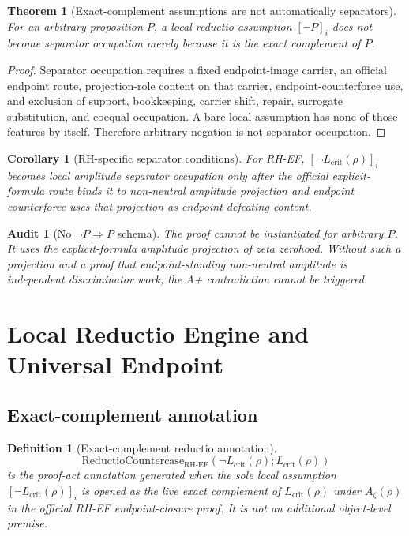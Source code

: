 \documentclass[11pt]{article}
\newtheorem{definition}{Definition}[section]
\newtheorem{theorem}{Theorem}[section]
\newtheorem{corollary}{Corollary}[section]
\newtheorem{audit}{Audit}[section]
\newcommand{\Az}{A_{\zeta}}
\newcommand{\Lcrit}{L_{\mathrm{crit}}}
\newcommand{\RH}{\mathrm{RH}}
\newcommand{\EF}{\mathrm{EF}}
\begin{document}
\begin{theorem}[Exact-complement assumptions are not automatically separators]
For an arbitrary proposition \(P\), a local reductio assumption \([\neg P]_i\) does not become separator occupation merely because it is the exact complement of \(P\).
\end{theorem}

\begin{proof}
Separator occupation requires a fixed endpoint-image carrier, an official endpoint route, projection-role content on that carrier, endpoint-counterforce use, and exclusion of support, bookkeeping, carrier shift, repair, surrogate substitution, and coequal occupation.  A bare local assumption has none of those features by itself.  Therefore arbitrary negation is not separator occupation.
\end{proof}

\begin{corollary}[RH-specific separator conditions]
For RH-EF, \([\neg\Lcrit(\rho)]_i\) becomes local amplitude separator occupation only after the official explicit-formula route binds it to non-neutral amplitude projection and endpoint counterforce uses that projection as endpoint-defeating content.
\end{corollary}

\begin{audit}[No \(\neg P\Rightarrow P\) schema]
The proof cannot be instantiated for arbitrary \(P\).  It uses the explicit-formula amplitude projection of zeta zerohood.  Without such a projection and a proof that endpoint-standing non-neutral amplitude is independent discriminator work, the A+ contradiction cannot be triggered.
\end{audit}

\section{Local Reductio Engine and Universal Endpoint}

\subsection{Exact-complement annotation}

\begin{definition}[Exact-complement reductio annotation]
\[
\mathrm{ReductioCountercase}_{\RH\text{-}\EF}(\neg\Lcrit(\rho);\Lcrit(\rho))
\]
is the proof-act annotation generated when the sole local assumption \([\neg\Lcrit(\rho)]_i\) is opened as the live exact complement of \(\Lcrit(\rho)\) under \(\Az(\rho)\) in the official RH-EF endpoint-closure proof.  It is not an additional object-level premise.
\end{definition}
\end{document}

